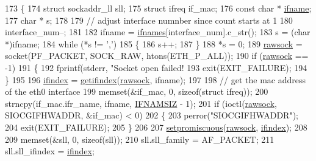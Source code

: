 \begin{DoxyCode}
173 \{
174     \textcolor{keyword}{struct }sockaddr\_ll sll;
175     \textcolor{keyword}{struct }ifreq if\_mac;
176     \textcolor{keyword}{const} \textcolor{keywordtype}{char} * \hyperlink{aaf-talker_8c_ac7b430acaa92a7a26fbcdad47d2efc20}{ifname};
177     \textcolor{keywordtype}{char} * s;
178 
179     \textcolor{comment}{// adjust interface numnber since count starts at 1}
180     interface\_num--;
181 
182     ifname = \hyperlink{classavdecc__lib_1_1net__interface__imp_a00031dfb5f1a1ca3fc12dd11b601030a}{ifnames}[interface\_num].c\_str();
183     s = (\textcolor{keywordtype}{char} *)ifname;
184     \textcolor{keywordflow}{while} (*s != \textcolor{charliteral}{','})
185     \{
186         s++;
187     \}
188     *s = 0;
189     \hyperlink{classavdecc__lib_1_1net__interface__imp_a9a1008a3b40e75b22aa5d7945cbf2918}{rawsock} = socket(PF\_PACKET, SOCK\_RAW, htons(ETH\_P\_ALL));
190     \textcolor{keywordflow}{if} (\hyperlink{classavdecc__lib_1_1net__interface__imp_a9a1008a3b40e75b22aa5d7945cbf2918}{rawsock} == -1)
191     \{
192         fprintf(stderr, \textcolor{stringliteral}{"Socket open failed! %
193         exit(EXIT\_FAILURE);
194     \}
195 
196     \hyperlink{classavdecc__lib_1_1net__interface__imp_a01e636f8746c84f1cf3d45c4afbfde35}{ifindex} = \hyperlink{classavdecc__lib_1_1net__interface__imp_a48cf4d43e78a0d1b53aa3d33dfb2438b}{getifindex}(\hyperlink{classavdecc__lib_1_1net__interface__imp_a9a1008a3b40e75b22aa5d7945cbf2918}{rawsock}, ifname);
197 
198     \textcolor{comment}{// get the mac address of the eth0 interface}
199     memset(&if\_mac, 0, \textcolor{keyword}{sizeof}(\textcolor{keyword}{struct} ifreq));
200     strncpy(if\_mac.ifr\_name, ifname, \hyperlink{openavb__avdecc__pub_8h_acd06da230a96d3b7e6f193c5b3142002}{IFNAMSIZ} - 1);
201     \textcolor{keywordflow}{if} (ioctl(\hyperlink{classavdecc__lib_1_1net__interface__imp_a9a1008a3b40e75b22aa5d7945cbf2918}{rawsock}, SIOCGIFHWADDR, &if\_mac) < 0)
202     \{
203         perror(\textcolor{stringliteral}{"SIOCGIFHWADDR"});
204         exit(EXIT\_FAILURE);
205     \}
206 
207     \hyperlink{classavdecc__lib_1_1net__interface__imp_a2bbf868bdf2af34459311c9d00cbbeba}{setpromiscuous}(\hyperlink{classavdecc__lib_1_1net__interface__imp_a9a1008a3b40e75b22aa5d7945cbf2918}{rawsock}, \hyperlink{classavdecc__lib_1_1net__interface__imp_a01e636f8746c84f1cf3d45c4afbfde35}{ifindex});
208 
209     memset(&sll, 0, \textcolor{keyword}{sizeof}(sll));
210     sll.sll\_family = AF\_PACKET;
211     sll.sll\_ifindex = \hyperlink{classavdecc__lib_1_1net__interface__imp_a01e636f8746c84f1cf3d45c4afbfde35}{ifindex};
}
\end{DoxyCode}
